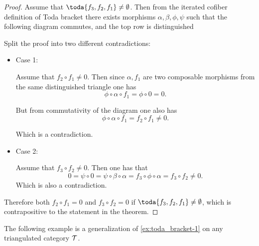 \begin{proof}
	Assume that \( \toda{f_3, f_2, f_1} \neq \emptyset \). Then from the iterated cofiber definition of Toda bracket there exists morphisms \( \alpha, \beta, \phi, \psi \) such that the following diagram commutes, and the top row is distinguished
	\begin{center}
	\end{center}

	Split the proof into two different contradictions:

	\begin{itemize}
		\item{
			Case 1:

			Assume that \( f_2 \circ f_1 \neq 0 \). Then since \( \alpha, f_1 \) are two composable morphisms from the same distinguished triangle one has
			\[
				\phi \circ \alpha \circ f_1 = \phi \circ 0 = 0.
			\]

			But from commutativity of the diagram one also has
			\[
				\phi \circ \alpha \circ f_1 = f_2 \circ f_1 \neq 0.
			\]

			Which is a contradiction.
		}
		\item{
			Case 2:

			Assume that \( f_3 \circ f_2 \neq 0 \). Then one has that
			\[
				0 = \psi \circ 0 = \psi \circ \beta \circ \alpha = f_3 \circ \phi \circ \alpha = f_3 \circ f_2 \neq 0.
			\]
			Which is also a contradiction.
		}
	\end{itemize}

	Therefore both \( f_2 \circ f_1 = 0 \) and \( f_3 \circ f_2 = 0 \) if \( \toda{f_3, f_2, f_1} \neq \emptyset \), which is contrapositive to the statement in the theorem.
\end{proof}

The following example is a generalization of \autoref{ex:toda_bracket-1} on any triangulated category \( {\mathcal{T}} \).

